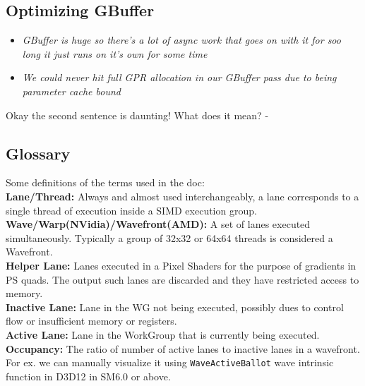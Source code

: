 \documentclass[14pt]{article}
\begin{document}
\subsection*{Optimizing GBuffer}

\begin{itemize}
	\item \textit{GBuffer is huge so there's a lot of async work that goes on with it for soo long it just runs on it's own for some time}
	
	\item \textit{We could never hit full GPR allocation in our GBuffer pass due to being parameter cache bound}
\end{itemize}

Okay the second sentence is daunting! What does it mean? - 
 
\subsection*{Glossary}
Some definitions of the terms used in the doc: \\

\textbf{Lane/Thread:} Always and almost used interchangeably, a lane corresponds to a single thread of execution inside a SIMD execution group.\cite{wave} \\ 

\textbf{Wave/Warp(NVidia)/Wavefront(AMD):} A set of lanes executed simultaneously. Typically a group of 32x32 or 64x64 threads is considered a Wavefront.\cite{wave} \\

\textbf{Helper Lane:} Lanes executed in a Pixel Shaders for the purpose of gradients in PS quads. The output such lanes are discarded and they have restricted access to memory.\cite{wave} \\

\textbf{Inactive Lane:} Lane in the WG not being executed, possibly dues to control flow or insufficient memory or registers.\cite{wave} \\

\textbf{Active Lane:} Lane in the WorkGroup that is currently being executed.\cite{wave} \\

\textbf{Occupancy:} The ratio of number of active lanes to inactive lanes in a wavefront. For ex. we can manually visualize it using \lstinline|WaveActiveBallot| wave intrinsic function in D3D12 in SM6.0 or above. \\
\end{document}
